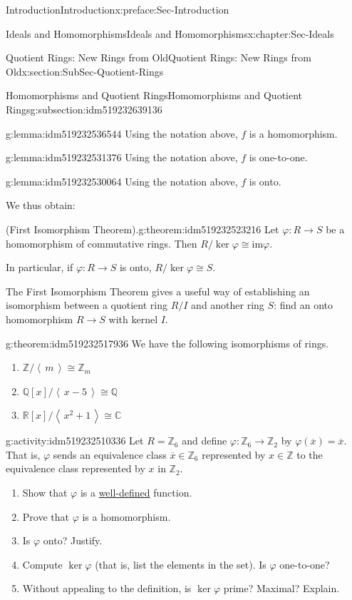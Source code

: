 \documentclass[oneside,10pt,]{book}
\numberwithin{equation}{section}
\newcommand{\ideal}[1]{\left\langle\, #1 \,\right\rangle}
\def\p{\varphi}
\def\im{\text{im}}
\def\C{{\mathbb C}}
\def\Z{{\mathbb Z}}
\def\Q{{\mathbb Q}}
\def\R{{\mathbb R}}
\begin{document}
\begin{preface}{Introduction}{}{Introduction}{}{}{x:preface:Sec-Introduction}
\begin{chapterptx}{Ideals and Homomorphisms}{}{Ideals and Homomorphisms}{}{}{x:chapter:Sec-Ideals}
\begin{sectionptx}{Quotient Rings: New Rings from Old}{}{Quotient Rings: New Rings from Old}{}{}{x:section:SubSec-Quotient-Rings}
\begin{subsectionptx}{Homomorphisms and Quotient Rings}{}{Homomorphisms and Quotient Rings}{}{}{g:subsection:idm519232639136}
\begin{lemma}{}{}{g:lemma:idm519232536544}
Using the notation above, \(f\) is a homomorphism.%
\end{lemma}
\begin{lemma}{}{}{g:lemma:idm519232531376}%
Using the notation above, \(f\) is one-to-one.%
\end{lemma}
\begin{lemma}{}{}{g:lemma:idm519232530064}%
Using the notation above, \(f\) is onto.%
\end{lemma}
We thus obtain:%
\begin{theorem}{(First Isomorphism Theorem).}{}{g:theorem:idm519232523216}%
%
Let \(\p : R\to S\) be a homomorphism of commutative rings. Then \(R/\ker \p \cong \im \p\).%
\par
In particular, if \(\p : R\to S\) is onto, \(R/\ker \p \cong S\).%
\end{theorem}
The First Isomorphism Theorem gives a useful way of establishing an isomorphism between a quotient ring \(R/I\) and another ring \(S\): find an onto homomorphism \(R\to S\) with kernel \(I\).%
\begin{theorem}{}{}{g:theorem:idm519232517936}%
We have the following isomorphisms of rings.%
\begin{enumerate}
\item{}\(\Z/\ideal{m} \cong \Z_m\)%
\item{}\(\Q[x]/\ideal{x-5} \cong \Q\)%
\item{}\(\R[x]/\ideal{x^2+1} \cong \C\)%
\end{enumerate}
%
\end{theorem}
\begin{activity}{}{g:activity:idm519232510336}%
Let \(R = \Z_6\) and define \(\p : \Z_6 \to \Z_2\) by \(\p(\overline{x}) = \overline{x}\). That is, \(\p\) sends an equivalence class \(\overline{x}\in \Z_6\) represented by \(x\in \Z\) to the equivalence class represented by \(x\) in \(\Z_2\).%
%
\begin{enumerate}
\item{}Show that \(\p\) is a \hyperref[x:definition:def-well-defined]{well-defined} function.%
\item{}Prove that \(\p\) is a homomorphism.%
\item{}Is \(\p\) onto? Justify.%
\item{}Compute \(\ker\p\) (that is, list the elements in the set). Is \(\p\) one-to-one?%
\item{}Without appealing to the definition, is \(\ker\p\) prime? Maximal? Explain.%
\end{enumerate}

\end{activity}
\end{subsectionptx}
\end{sectionptx}
\end{chapterptx}
\end{preface}
\end{document}
